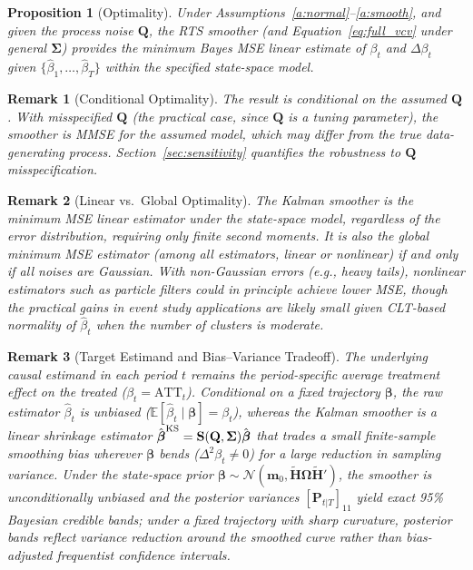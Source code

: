 \documentclass[12pt]{article}
\newtheorem{proposition}{Proposition}
\newtheorem{remark}{Remark}
\begin{document}
\begin{proposition}[Optimality]\label{prop:optimal}
Under Assumptions~\ref{a:normal}--\ref{a:smooth}, and given the process noise $\mathbf{Q}$, the RTS smoother (and Equation~\eqref{eq:full_vcv} under general $\boldsymbol\Sigma$) provides the minimum Bayes MSE linear estimate of $\beta_t$ and $\Delta\beta_t$ given $\{\hat{\beta}_1, \ldots, \hat{\beta}_T\}$ within the specified state-space model.
\end{proposition}

\begin{remark}[Conditional Optimality]
The result is conditional on the assumed $\mathbf{Q}$. With misspecified $\mathbf{Q}$ (the practical case, since $\mathbf{Q}$ is a tuning parameter), the smoother is MMSE for the assumed model, which may differ from the true data-generating process. Section~\ref{sec:sensitivity} quantifies the robustness to $\mathbf{Q}$ misspecification.
\end{remark}

\begin{remark}[Linear vs.\ Global Optimality]
The Kalman smoother is the minimum MSE \emph{linear} estimator under the state-space model, regardless of the error distribution, requiring only finite second moments. It is also the global minimum MSE estimator (among all estimators, linear or nonlinear) if and only if all noises are Gaussian. With non-Gaussian errors (e.g., heavy tails), nonlinear estimators such as particle filters could in principle achieve lower MSE, though the practical gains in event study applications are likely small given CLT-based normality of $\hat{\beta}_t$ when the number of clusters is moderate.
\end{remark}

\begin{remark}[Target Estimand and Bias--Variance Tradeoff]
The underlying causal estimand in each period $t$ remains the period-specific average treatment effect on the treated ($\beta_t = \text{ATT}_t$). Conditional on a fixed trajectory $\boldsymbol\beta$, the raw estimator $\hat{\beta}_t$ is unbiased ($\mathbb{E}[\hat{\beta}_t \mid \boldsymbol\beta] = \beta_t$), whereas the Kalman smoother is a linear shrinkage estimator $\hat{\boldsymbol\beta}^{\rm KS} = \mathbf{S}(\mathbf{Q}, \boldsymbol\Sigma)\hat{\boldsymbol\beta}$ that trades a small finite-sample smoothing bias wherever $\boldsymbol\beta$ bends ($\Delta^2 \beta_t \neq 0$) for a large reduction in sampling variance. Under the state-space prior $\boldsymbol\beta \sim \mathcal{N}(\mathbf{m}_0, \widetilde{\mathbf{H}}\boldsymbol\Omega\widetilde{\mathbf{H}}')$, the smoother is unconditionally unbiased and the posterior variances $[\mathbf{P}_{t|T}]_{11}$ yield exact 95\% Bayesian credible bands; under a fixed trajectory with sharp curvature, posterior bands reflect variance reduction around the smoothed curve rather than bias-adjusted frequentist confidence intervals.
\end{remark}
\end{document}

